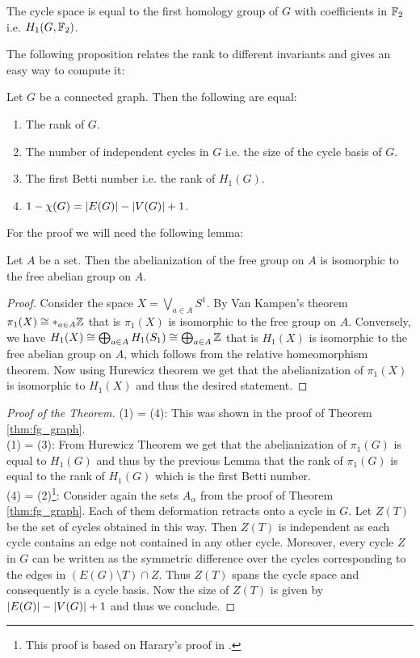 \begin{remark}
	The cycle space is equal to the first homology group of $G$ with coefficients in $\mathbb{F}_2$ i.e. $H_1(G,\mathbb{F}_2)$.
\end{remark}

The following proposition relates the rank to different invariants and gives an easy way to compute it: 
\begin{proposition}\label{prop:rank}
	Let $G$ be a connected graph. Then the following are equal:
	\begin{enumerate}
		\item The rank of $G$.
		\item The number of independent cycles in $G$ i.e. the size of the cycle basis of $G$.
		\item The first Betti number i.e. the rank of $H_{1}(G)$.
		\item $1 - \chi(G) = \abs{E(G)} - \abs{V(G)} + 1$.
	\end{enumerate}
\end{proposition}

For the proof we will need the following lemma:
\begin{lemma}
	Let $A$ be a set. Then the abelianization of the free group on $A$ is isomorphic to the free abelian group on $A$.
\end{lemma}

\begin{proof}
	Consider the space $X = \bigvee_{a \in A} S^{1}$. By Van Kampen's theorem $\pi_1(X) \cong *_{a \in A} \mathbb{Z}$ that is $\pi_1(X)$ is isomorphic to the free group on $A$.
	Conversely, we have $H_1(X) \cong \bigoplus_{a \in A} H_1(S_1) \cong \bigoplus_{a \in A} \mathbb{Z}$ that is $H_1(X)$ is isomorphic to the free abelian group on $A$, 
	which follows from the relative homeomorphism theorem.
	Now using Hurewicz theorem we get that the abelianization of $\pi_1(X)$ is isomorphic to $H_1(X)$ and thus the desired statement.
\end{proof}

\begin{proof}[Proof of the Theorem]
	(1) = (4): This was shown in the proof of Theorem \ref{thm:fg_graph}.\\
	(1) = (3): From Hurewicz Theorem we get that the abelianization of $\pi_{1}(G)$ is equal to $H_{1}(G)$
	and thus by the previous Lemma that the rank of $\pi_1(G)$ is equal to the rank of $H_1(G)$ which is the first Betti number.\\
	(4) = (2)\footnote{This proof is based on Harary's proof in \cite[p. 37-40]{harary69}.}:
		Consider again the sets $A_{\alpha}$ from the proof of Theorem \ref{thm:fg_graph}. Each of them deformation retracts onto a cycle in $G$.
	Let $Z(T)$ be the set of cycles obtained in this way. Then  $Z(T)$ is independent as each cycle contains an edge not contained in any other cycle.
	Moreover, every cycle $Z$ in $G$ can be written as the symmetric difference over the cycles corresponding to the edges in $(E(G) \setminus T) \cap Z$.
	Thus $Z(T)$ spans the cycle space and consequently is a cycle basis. Now the size of $Z(T)$ is given by $\abs{E(G)} - \abs{V(G)} + 1$ and thus we conclude.
\end{proof}

